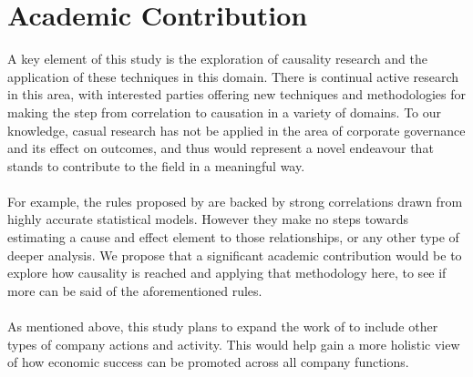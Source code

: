 \section{Academic Contribution}
{A key element of this study is the exploration of causality research and the application of these techniques in this domain. There is continual active research in this area, with interested parties offering new techniques and methodologies for making the step from correlation to causation in a variety of domains. To our knowledge, casual research has not be applied in the area of corporate governance and its effect on outcomes, and thus would represent a novel endeavour that stands to contribute to the field in a meaningful way. \\\\ 
For example, the rules proposed by \cite{moldovan2015learning} are backed by strong correlations drawn from highly accurate statistical models. However they make no steps towards estimating a cause and effect element to those relationships, or any other type of deeper analysis. We propose that a significant academic contribution would be to explore how causality is reached and applying that methodology here, to see if more can be said of the aforementioned rules. \\\\
As mentioned above, this study plans to expand the work of \cite{moldovan2015learning} to include other types of company actions and activity. This would help gain a more holistic view of how economic success can be promoted across all company functions. }
